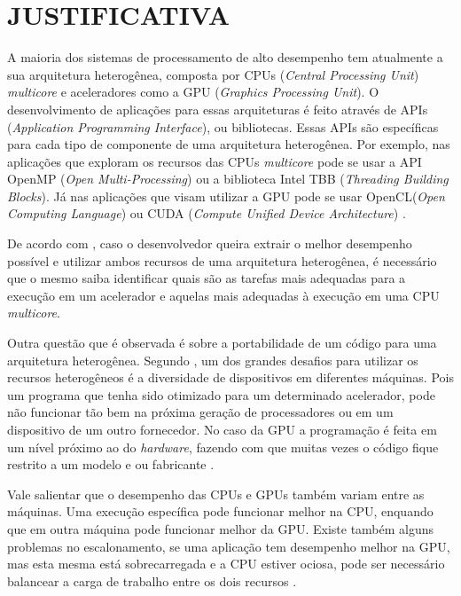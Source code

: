 
\chapter{JUSTIFICATIVA}
\label{chap:justificativa}

A maioria dos sistemas de processamento de alto desempenho tem atualmente a sua arquitetura heterogênea,
composta por CPUs (\textit{Central Processing Unit}) \textit{multicore} e aceleradores como a GPU (\textit{Graphics Processing Unit}).
O desenvolvimento de aplicações para essas arquiteturas é feito através de APIs (\textit{Application Programming Interface}), ou bibliotecas.
Essas APIs são específicas para cada tipo de componente de uma arquitetura heterogênea. Por exemplo, nas aplicações que exploram os recursos
das CPUs \textit{multicore} pode se usar a API OpenMP (\textit{Open Multi-Processing}) \cite{openmp:2018} ou a biblioteca
Intel TBB \cite{inteltbb:2018} (\textit{Threading Building Blocks}).
Já nas aplicações que visam utilizar a GPU pode se usar OpenCL(\textit{Open Computing Language}) \cite{opencl:2018} ou CUDA (\textit{Compute Unified Device Architecture}) \cite{cuda:2018}.

De acordo com \cite{intrArqHete:2012}, caso o desenvolvedor queira extrair o melhor desempenho possível e utilizar ambos recursos de uma
arquitetura heterogênea, é necessário que o mesmo saiba identificar quais são as tarefas mais adequadas para a execução em um acelerador
e aquelas mais adequadas à execução em uma CPU \textit{multicore}.

Outra questão que é observada é sobre a portabilidade de um código para uma arquitetura heterogênea.
Segundo \cite{problemsArqHete:2013}, um dos grandes desafios para utilizar os recursos heterogêneos é a diversidade de dispositivos em diferentes máquinas.
Pois um programa que tenha sido otimizado para um determinado acelerador, pode não funcionar tão bem na próxima geração de processadores ou em um dispositivo de um outro fornecedor.
No caso da GPU a programação é feita em um nível próximo ao do \textit{hardware}, fazendo com que muitas vezes o código fique restrito a um modelo e ou fabricante \cite{pinto2011ambientes}.

Vale salientar que o desempenho das CPUs e GPUs também variam entre as máquinas.
Uma execução específica pode funcionar melhor na CPU, enquando que em outra máquina pode funcionar melhor da GPU.
Existe também alguns problemas no escalonamento, se uma aplicação tem desempenho melhor na GPU, mas esta mesma está sobrecarregada e a CPU estiver ociosa, pode ser necessário balancear
a carga de trabalho entre os dois recursos \cite{problemsArqHete:2013}.

